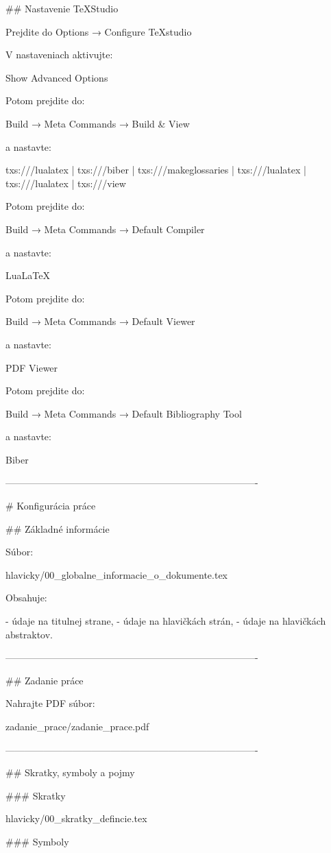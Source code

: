 \iffalse
## Nastavenie TeXStudio

Prejdite do Options → Configure TeXstudio

V nastaveniach aktivujte:

Show Advanced Options

Potom prejdite do:

Build → Meta Commands → Build & View

a nastavte:

txs:///lualatex |
txs:///biber |
txs:///makeglossaries |
txs:///lualatex |
txs:///lualatex |
txs:///view

Potom prejdite do:

Build → Meta Commands → Default Compiler

a nastavte:

LuaLaTeX

Potom prejdite do:

Build → Meta Commands → Default Viewer

a nastavte:

PDF Viewer

Potom prejdite do:

Build → Meta Commands → Default Bibliography Tool

a nastavte:

Biber

-------------------------------------------------------------------------------

# Konfigurácia práce

## Základné informácie

Súbor:

hlavicky/00_globalne_informacie_o_dokumente.tex

Obsahuje:

- údaje na titulnej strane,
- údaje na hlavičkách strán,
- údaje na hlavičkách abstraktov.

-------------------------------------------------------------------------------

## Zadanie práce

Nahrajte PDF súbor:

zadanie_prace/zadanie_prace.pdf

-------------------------------------------------------------------------------

## Skratky, symboly a pojmy

### Skratky

hlavicky/00_skratky_defincie.tex

### Symboly

